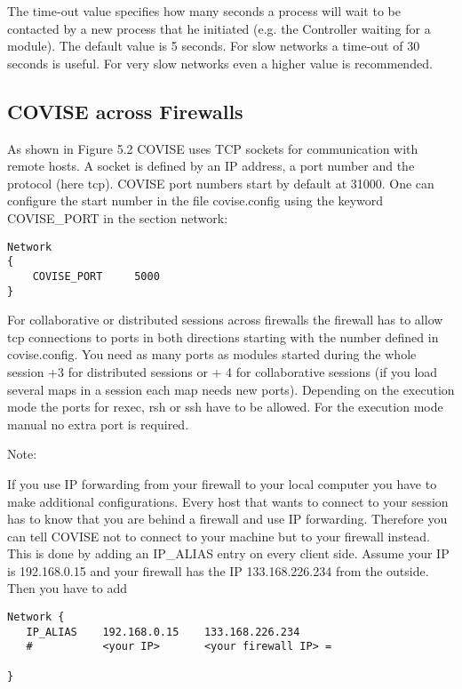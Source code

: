 The time-out value specifies how many seconds a process will wait to be contacted by a 
new process that he initiated (e.g. the Controller waiting for a module). The default 
value is 5 seconds. For slow networks a time-out of 30 seconds is useful. For very 
slow networks even a higher value is recommended.


\subsection{COVISE across Firewalls}

As shown in Figure 5.2 COVISE uses TCP sockets for communication with remote hosts. 
A socket is defined by an IP address, a port number and the protocol (here tcp). COVISE 
port numbers start by default at 31000. One can configure the start number in the 
file covise.config using the keyword COVISE\_PORT in the section network:
 
\begin{verbatim}
Network
{
    COVISE_PORT     5000
}
\end{verbatim}

For collaborative or distributed sessions across firewalls the firewall has to allow 
tcp connections to ports in both directions starting with the number defined in 
covise.config. You need as many ports as modules started during the whole session +3 
for distributed sessions or + 4 for collaborative sessions (if you load several maps 
in a session each map needs new ports). Depending on the execution mode the ports for 
rexec, rsh or ssh have to be allowed. For the execution mode manual no extra port 
is required.

Note:

If you use IP forwarding from your firewall to your local computer you
have to make additional configurations.
Every host that wants to connect to your session has to know that you
are behind a firewall and use IP forwarding.
Therefore you can tell COVISE not to connect to your machine but to your
firewall instead. This is done by adding an IP\_ALIAS entry on every client side. 
Assume your IP is 192.168.0.15 and your firewall has the IP 133.168.226.234 
from the outside. Then you have to add

\begin{verbatim}
Network {
   IP_ALIAS    192.168.0.15    133.168.226.234
   #           <your IP>       <your firewall IP> =

}
\end{verbatim}

